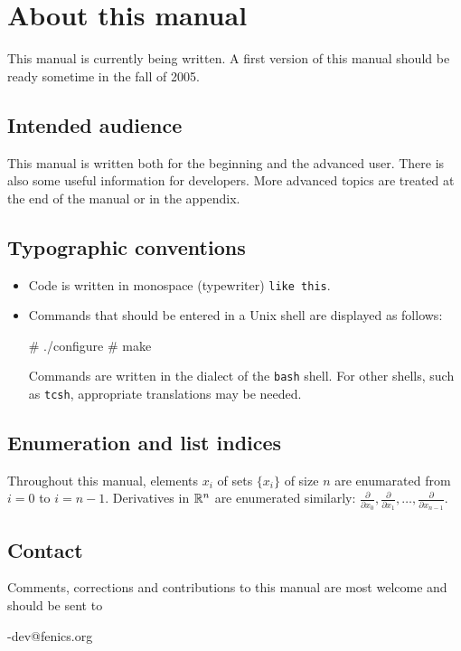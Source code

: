 
\chapter*{About this manual}

This manual is currently being written. A first version of this manual
should be ready sometime in the fall of 2005.

\section*{Intended audience}

This manual is written both for the beginning and the advanced user.
There is also some useful information for developers. More advanced topics
are treated at the end of the manual or in the appendix.

\section*{Typographic conventions}

\begin{itemize}
\item
  Code is written in monospace (typewriter) \texttt{like this}.
\item
  Commands that should be entered in a Unix shell
  are displayed as follows:
  \begin{code}
    # ./configure
    # make
  \end{code}
  Commands are written in the dialect of the \texttt{bash} shell. For
  other shells, such as \texttt{tcsh}, appropriate translations may be
  needed.
\end{itemize}

\section*{Enumeration and list indices}

Throughout this manual, elements $x_i$ of sets $\{x_i\}$ of size $n$
are enumarated from $i = 0$ to $i = n-1$. Derivatives in $\mathbb{R}^n$ are
enumerated similarly:
$\frac{\partial}{\partial x_0}, \frac{\partial}{\partial x_1},
 \ldots, \frac{\partial}{\partial x_{n-1}}$.

\section*{Contact}

Comments, corrections and contributions to this manual are most welcome
and should be sent to
\begin{code}
  \packagett{}-dev@fenics.org    
\end{code}
